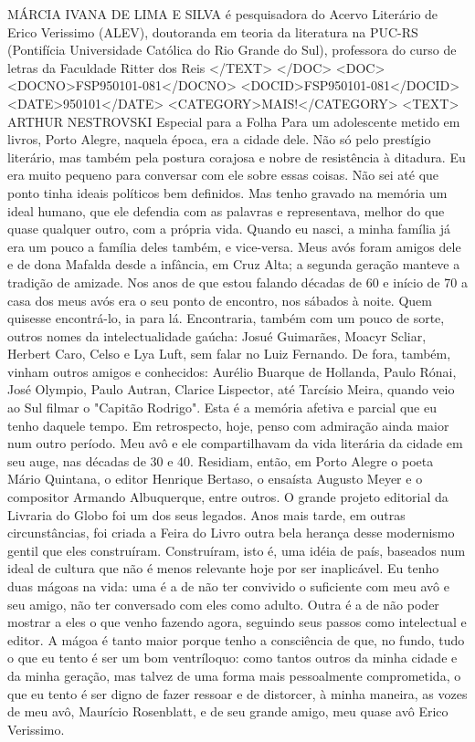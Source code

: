 MÁRCIA IVANA DE LIMA E SILVA é pesquisadora do Acervo Literário de Erico Verissimo (ALEV), doutoranda em teoria da literatura na PUC-RS (Pontifícia Universidade Católica do Rio Grande do Sul), professora do curso de letras da Faculdade Ritter dos Reis
</TEXT>
</DOC>
<DOC>
<DOCNO>FSP950101-081</DOCNO>
<DOCID>FSP950101-081</DOCID>
<DATE>950101</DATE>
<CATEGORY>MAIS!</CATEGORY>
<TEXT>
ARTHUR NESTROVSKI 
Especial para a Folha 
Para um adolescente metido em livros, Porto Alegre, naquela época, era a cidade dele. Não só pelo prestígio literário, mas também pela postura corajosa e nobre de resistência à ditadura. Eu era muito pequeno para conversar com ele sobre essas coisas. Não sei até que ponto tinha ideais políticos bem definidos. Mas tenho gravado na memória um ideal humano, que ele defendia com as palavras e representava, melhor do que quase qualquer outro, com a própria vida.
Quando eu nasci, a minha família já era um pouco a família deles também, e vice-versa. Meus avós foram amigos dele e de dona Mafalda desde a infância, em Cruz Alta; a segunda geração manteve a tradição de amizade. Nos anos de que estou falando décadas de 60 e início de 70 a casa dos meus avós era o seu ponto de encontro, nos sábados à noite. Quem quisesse encontrá-lo, ia para lá.
Encontraria, também com um pouco de sorte, outros nomes da intelectualidade gaúcha: Josué Guimarães, Moacyr Scliar, Herbert Caro, Celso e Lya Luft, sem falar no Luiz Fernando. De fora, também, vinham outros amigos e conhecidos: Aurélio Buarque de Hollanda, Paulo Rónai, José Olympio, Paulo Autran, Clarice Lispector, até Tarcísio Meira, quando veio ao Sul filmar o "Capitão Rodrigo".
Esta é a memória afetiva e parcial que eu tenho daquele tempo. Em retrospecto, hoje, penso com admiração ainda maior num outro período. Meu avô e ele compartilhavam da vida literária da cidade em seu auge, nas décadas de 30 e 40. Residiam, então, em Porto Alegre o poeta Mário Quintana, o editor Henrique Bertaso, o ensaísta Augusto Meyer e o compositor Armando Albuquerque, entre outros. O grande projeto editorial da Livraria do Globo foi um dos seus legados. Anos mais tarde, em outras circunstâncias, foi criada a Feira do Livro outra bela herança desse modernismo gentil que eles construíram. Construíram, isto é, uma idéia de país, baseados num ideal de cultura que não é menos relevante hoje por ser inaplicável.
Eu tenho duas mágoas na vida: uma é a de não ter convivido o suficiente com meu avô e seu amigo, não ter conversado com eles como adulto. Outra é a de não poder mostrar a eles o que venho fazendo agora, seguindo seus passos como intelectual e editor. A mágoa é tanto maior porque tenho a consciência de que, no fundo, tudo o que eu tento é ser um bom ventríloquo: como tantos outros da minha cidade e da minha geração, mas talvez de uma forma mais pessoalmente comprometida, o que eu tento é ser digno de fazer ressoar e de distorcer, à minha maneira, as vozes de meu avô, Maurício Rosenblatt, e de seu grande amigo, meu quase avô Erico Verissimo.

